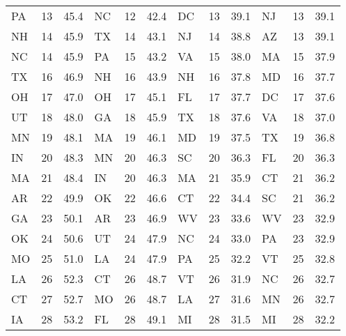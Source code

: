 \begin{longtable}{lrr|lrr||lrr|lrr}
        PA &   13 &   45.4 &            NC &   12 &  42.4 &             DC &   13 &   39.1 &            NJ &   13 &   39.1 \\
        NH &   14 &   45.9 &            TX &   14 &  43.1 &             NJ &   14 &   38.8 &            AZ &   13 &   39.1 \\
        NC &   14 &   45.9 &            PA &   15 &  43.2 &             VA &   15 &   38.0 &            MA &   15 &   37.9 \\
        TX &   16 &   46.9 &            NH &   16 &  43.9 &             NH &   16 &   37.8 &            MD &   16 &   37.7 \\
        OH &   17 &   47.0 &            OH &   17 &  45.1 &             FL &   17 &   37.7 &            DC &   17 &   37.6 \\
        UT &   18 &   48.0 &            GA &   18 &  45.9 &             TX &   18 &   37.6 &            VA &   18 &   37.0 \\
        MN &   19 &   48.1 &            MA &   19 &  46.1 &             MD &   19 &   37.5 &            TX &   19 &   36.8 \\
        IN &   20 &   48.3 &            MN &   20 &  46.3 &             SC &   20 &   36.3 &            FL &   20 &   36.3 \\
        MA &   21 &   48.4 &            IN &   20 &  46.3 &             MA &   21 &   35.9 &            CT &   21 &   36.2 \\
        AR &   22 &   49.9 &            OK &   22 &  46.6 &             CT &   22 &   34.4 &            SC &   21 &   36.2 \\
        GA &   23 &   50.1 &            AR &   23 &  46.9 &             WV &   23 &   33.6 &            WV &   23 &   32.9 \\
        OK &   24 &   50.6 &            UT &   24 &  47.9 &             NC &   24 &   33.0 &            PA &   23 &   32.9 \\
        MO &   25 &   51.0 &            LA &   24 &  47.9 &             PA &   25 &   32.2 &            VT &   25 &   32.8 \\
        LA &   26 &   52.3 &            CT &   26 &  48.7 &             VT &   26 &   31.9 &            NC &   26 &   32.7 \\
        CT &   27 &   52.7 &            MO &   26 &  48.7 &             LA &   27 &   31.6 &            MN &   26 &   32.7 \\
        IA &   28 &   53.2 &            FL &   28 &  49.1 &             MI &   28 &   31.5 &            MI &   28 &   32.2 \\

\end{longtable}
